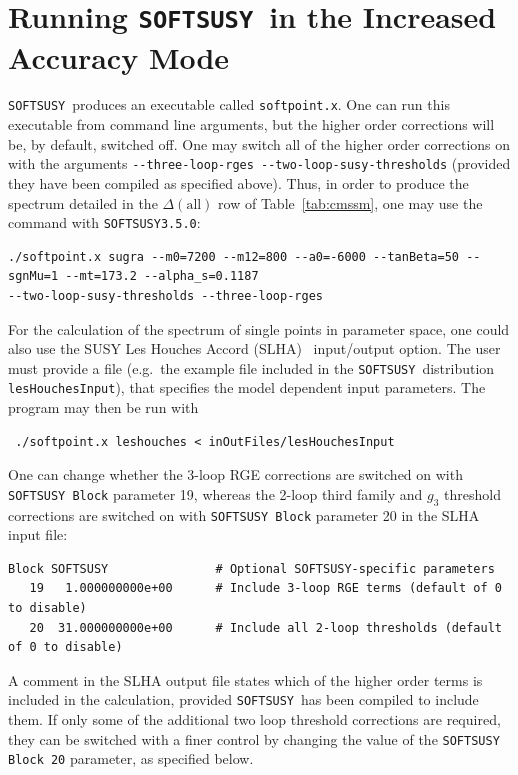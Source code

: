 \documentclass[final,3p,times,pdflatex]{elsarticle}
\def\SOFTSUSY{{\tt SOFTSUSY}}
\def\code#1{{\tt #1}}
\begin{document}
\section{Running \SOFTSUSY~in the Increased Accuracy Mode}  
\label{sec:run}

\SOFTSUSY~produces an executable called \code{softpoint.x}. 
One can run this executable from command line arguments, but the higher order
corrections will be, by default, switched off. One may switch all of the
higher order corrections on with 
the arguments 
\verb|--three-loop-rges --two-loop-susy-thresholds|
(provided they have
been compiled as specified above).
Thus, in order to produce the spectrum detailed in the $\Delta(\mbox{all})$
row of Table~\ref{tab:cmssm}, one may use the command with {\tt SOFTSUSY3.5.0}:
{\small\begin{verbatim}
./softpoint.x sugra --m0=7200 --m12=800 --a0=-6000 --tanBeta=50 --sgnMu=1 --mt=173.2 --alpha_s=0.1187 
--two-loop-susy-thresholds --three-loop-rges
\end{verbatim}\normalsize}
For the calculation
of the spectrum of single points in parameter space, one could also use the
SUSY Les Houches Accord (SLHA)~\cite{Skands:2003cj} input/output
option. The user must provide a file (e.g.\ the example file included
in the \SOFTSUSY~distribution
\code{lesHouchesInput}), that specifies the model dependent input
parameters. The program may then be run with
\small
\begin{verbatim}
 ./softpoint.x leshouches < inOutFiles/lesHouchesInput
\end{verbatim}
\normalsize

One can change whether the 3-loop RGE corrections are switched on with
\code{SOFTSUSY Block} parameter 19, whereas the 2-loop third family and $g_3$
threshold corrections 
are switched on with \code{SOFTSUSY Block} parameter 20 in the SLHA input file:
\begin{verbatim}
Block SOFTSUSY               # Optional SOFTSUSY-specific parameters
   19   1.000000000e+00      # Include 3-loop RGE terms (default of 0 to disable)
   20  31.000000000e+00      # Include all 2-loop thresholds (default of 0 to disable)
\end{verbatim}
A comment in the SLHA output file states which of the higher order terms is
included in the calculation, provided {\tt SOFTSUSY}~has been compiled to
include them. If only some of the additional two loop threshold corrections
are required, they can be switched with a finer control by changing the value
of the {\tt SOFTSUSY Block 20} parameter, as specified below.
\end{document}
